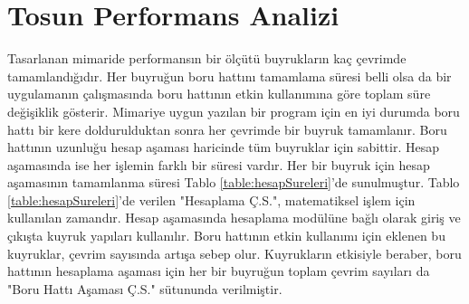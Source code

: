 \section{Tosun Performans Analizi}
Tasarlanan mimaride performansın bir ölçütü buyrukların kaç çevrimde tamamlandığıdır. Her buyruğun boru hattını tamamlama süresi belli olsa da bir uygulamanın çalışmasında boru hattının etkin kullanımına göre toplam süre değişiklik gösterir. Mimariye uygun yazılan bir program için en iyi durumda boru hattı bir kere doldurulduktan sonra her çevrimde bir buyruk tamamlanır. Boru hattının uzunluğu hesap aşaması haricinde tüm buyruklar için sabittir. Hesap aşamasında ise her işlemin farklı bir süresi vardır. Her bir buyruk için hesap aşamasının tamamlanma süresi Tablo \ref{table:hesapSureleri}'de sunulmuştur. Tablo \ref{table:hesapSureleri}'de verilen "Hesaplama Ç.S.", matematiksel işlem için kullanılan zamandır. Hesap aşamasında hesaplama modülüne bağlı olarak giriş ve çıkışta kuyruk yapıları kullanılır. Boru hattının etkin kullanımı için eklenen bu kuyruklar, çevrim sayısında artışa sebep olur. Kuyrukların etkisiyle beraber, boru hattının hesaplama aşaması için her bir buyruğun toplam çevrim sayıları da "Boru Hattı Aşaması Ç.S." sütununda verilmiştir. \par

